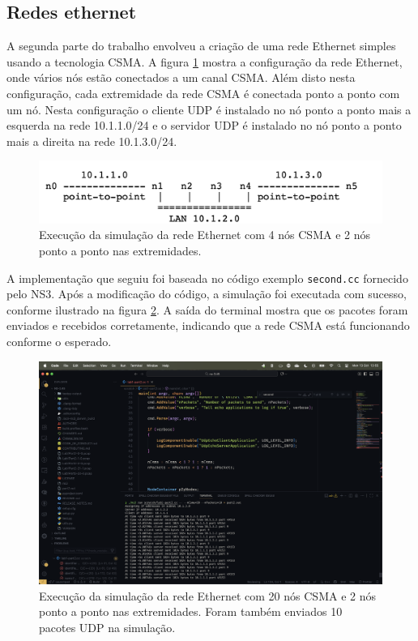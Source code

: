 \documentclass[12pt,a4paper]{article}
\begin{document}
\subsection{Redes ethernet}

A segunda parte do trabalho envolveu a criação de uma rede Ethernet simples usando a tecnologia CSMA. A figura \ref{fig:ethernet_topology} mostra a configuração da rede Ethernet, onde vários nós estão conectados a um canal CSMA. Além disto nesta configuração, cada extremidade da rede CSMA é conectada ponto a ponto com um nó. Nesta configuração o cliente UDP é instalado no nó ponto a ponto mais a esquerda na rede 10.1.1.0/24 e o servidor UDP é instalado no nó ponto a ponto mais a direita na rede 10.1.3.0/24.

\begin{figure}
    \centering
    \includegraphics[width=1\textwidth]{layout_csma.png}
    \caption{Execução da simulação da rede Ethernet com 4 nós CSMA e 2 nós ponto a ponto nas extremidades.}
    \label{fig:ethernet_topology}
\end{figure}

A implementação que seguiu foi baseada no código exemplo \texttt{second.cc} fornecido pelo NS3. Após a modificação do código, a simulação foi executada com sucesso, conforme ilustrado na figura \ref{fig:ethernet_simulation}. A saída do terminal mostra que os pacotes foram enviados e recebidos corretamente, indicando que a rede CSMA está funcionando conforme o esperado.

\begin{figure}
  \centering
  \includegraphics[width=1\textwidth]{run_csma.png}
  \caption{Execução da simulação da rede Ethernet com 20 nós CSMA e 2 nós ponto a ponto nas extremidades. Foram também enviados 10 pacotes UDP na simulação.}
  \label{fig:ethernet_simulation}
\end{figure}
\end{document}
